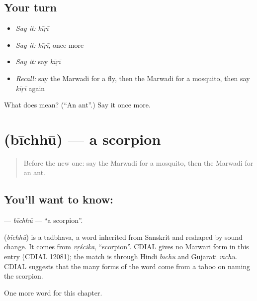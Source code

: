 \subsection*{Your turn}
\begin{itemize}
\raggedright
  \item \emph{Say it:} \emph{kīṛī}
  \item \emph{Say it:} \emph{kīṛī}, once more
  \item \emph{Say it:} say \emph{kīṛī}
  \item \emph{Recall:} say the Marwadi for a fly, then the Marwadi for a mosquito, then say \emph{kīṛī} again
\end{itemize}

\begin{tcolorbox}[breakable,colback=teal!4,colframe=teal!35!black,title={Before you move on}]
What does  mean? (\textquotedblleft{}An ant\textquotedblright{}.) Say it once more.
\end{tcolorbox}
\section[\texorpdfstring{\mw{बीछू} (bīchhū)}{बीछू (bīchhū)}]{ (bīchhū) — a scorpion}

\label{lesson:MW-C140-bichhu}



\begin{quote}
Before the new one: say the Marwadi for a mosquito, then the Marwadi for an ant.
\end{quote}

\subsection*{You'll want to know: }
\textbf{} — \emph{bīchhū} — \textquotedblleft{}a scorpion\textquotedblright{}.

\begin{cousinweb}
\textbf{} (\emph{bīchhū}) is a tadbhava, a word inherited from Sanskrit and reshaped by sound change. It comes from \emph{vṛścika}, \textquotedblleft{}scorpion\textquotedblright{}. CDIAL gives no Marwari form in this entry (CDIAL 12081); the match is through Hindi \emph{bīchū} and Gujarati \emph{vīchu}. CDIAL suggests that the many forms of the word come from a taboo on naming the scorpion.
\end{cousinweb}

\begin{grammarlens}[title={What you've built}]
One more word for this chapter.
\end{grammarlens}

